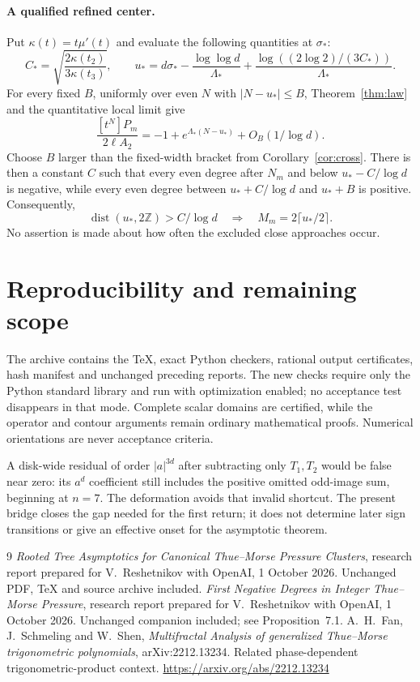 \documentclass[11pt,a4paper]{article}
\newcommand{\dist}{\operatorname{dist}}\newcommand{\Rea}{\operatorname{Re}}
\begin{document}
\paragraph{A qualified refined center.}
Put $\kappa(t)=t\mu'(t)$ and evaluate the following quantities at $\sigma_*$:
\[
 C_* =\sqrt{\frac{2\kappa(t_2)}{3\kappa(t_3)}},\qquad
 u_* =d\sigma_*-\frac{\log\log d}{\Lambda_*}
          +\frac{\log((2\log2)/(3C_*))}{\Lambda_*}.
\]
For every fixed $B$, uniformly over even $N$ with $|N-u_*|\le B$, Theorem~\ref{thm:law} and the quantitative local limit give
\[
 \frac{[t^N]P_m}{2\ell A_2}
 =-1+e^{\Lambda_*(N-u_*)}+O_B(1/\log d).
\]
Choose $B$ larger than the fixed-width bracket from Corollary~\ref{cor:cross}. There is then a constant $C$ such that every even degree after $N_m$ and below $u_*-C/\log d$ is negative, while every even degree between $u_*+C/\log d$ and $u_*+B$ is positive. Consequently,
\[
 \dist(u_*,2\mathbb Z)>C/\log d
 \quad\Longrightarrow\quad M_m=2\lceil u_*/2\rceil.
\]
No assertion is made about how often the excluded close approaches occur.

\section{Reproducibility and remaining scope}
The archive contains the TeX, exact Python checkers, rational output certificates, hash manifest and unchanged preceding reports. The new checks require only the Python standard library and run with optimization enabled; no acceptance test disappears in that mode. Complete scalar domains are certified, while the operator and contour arguments remain ordinary mathematical proofs. Numerical orientations are never acceptance criteria.

A disk-wide residual of order $|a|^{3d}$ after subtracting only $T_1,T_2$ would be false near zero: its $a^d$ coefficient still includes the positive omitted odd-image sum, beginning at $n=7$. The deformation avoids that invalid shortcut. The present bridge closes the gap needed for the first return; it does not determine later sign transitions or give an effective onset for the asymptotic theorem.

\begin{thebibliography}{9}\small
{} \emph{Rooted Tree Asymptotics for Canonical Thue--Morse Pressure Clusters}, research report prepared for V.~Reshetnikov with OpenAI, 1 October 2026. Unchanged PDF, TeX and source archive included.
 \emph{First Negative Degrees in Integer Thue--Morse Pressure}, research report prepared for V.~Reshetnikov with OpenAI, 1 October 2026. Unchanged companion included; see Proposition~7.1.
 A.~H.~Fan, J.~Schmeling and W.~Shen, \emph{Multifractal Analysis of generalized Thue--Morse trigonometric polynomials}, arXiv:2212.13234. Related phase-dependent trigonometric-product context.\newline
\url{https://arxiv.org/abs/2212.13234}
\end{thebibliography}
\end{document}
